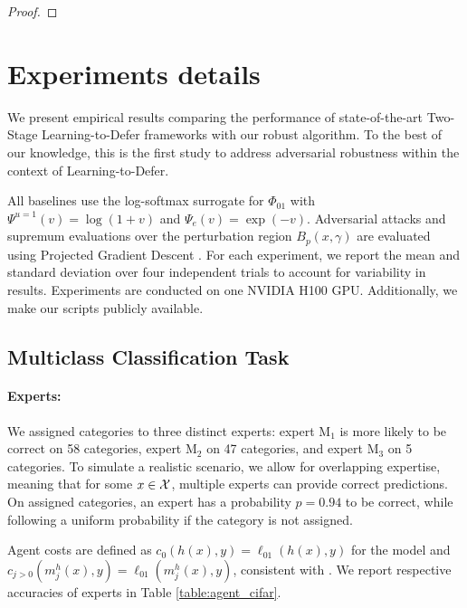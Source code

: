 \begin{appendices}
\begin{proof}


\end{proof}




\section{Experiments details}\label{appendix:details}
We present empirical results comparing the performance of state-of-the-art Two-Stage Learning-to-Defer frameworks \citep{mao2023twostage, mao2024regressionmultiexpertdeferral, montreuil2024twostagelearningtodefermultitasklearning} with our robust \name{} algorithm. To the best of our knowledge, this is the first study to address adversarial robustness within the context of Learning-to-Defer. 

All baselines use the log-softmax surrogate for $\Phi_{01}$ with $\Psi^{u=1}(v)=\log(1+v)$ and $\Psi_e(v)=\exp(-v)$. Adversarial attacks and supremum evaluations over the perturbation region \( B_p(x, \gamma) \) are evaluated using Projected Gradient Descent \citep{Madry2017TowardsDL}. For each experiment, we report the mean and standard deviation over four independent trials to account for variability in results. Experiments are conducted on one NVIDIA H100 GPU. Additionally, we make our scripts publicly available.


\subsection{Multiclass Classification Task}
\label{exp_appendix:class}
\paragraph{Experts:} We assigned categories to three distinct experts: expert M$_1$ is more likely to be correct on 58 categories, expert M$_2$ on 47 categories, and expert M$_3$ on 5 categories. To simulate a realistic scenario, we allow for overlapping expertise, meaning that for some $x \in \mathcal{X}$, multiple experts can provide correct predictions. On assigned categories, an expert has a probability $p=0.94$ to be correct, while following a uniform probability if the category is not assigned.  

Agent costs are defined as \( c_0(h(x), y) = \ell_{01}(h(x), y) \) for the model and \( c_{j > 0}(m_j^h(x), y) = \ell_{01}(m_j^h(x), y) \), consistent with \citep{mozannar2021consistent, Mozannar2023WhoSP, Verma2022LearningTD, Cao_Mozannar_Feng_Wei_An_2023, mao2023twostage}.  We report respective accuracies of experts in Table \ref{table:agent_cifar}.


\end{appendices}
